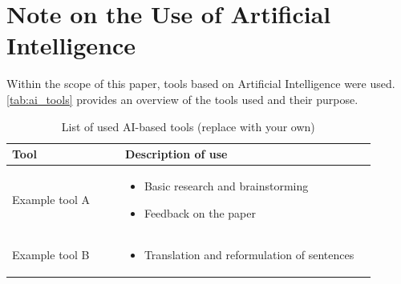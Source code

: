 \chapter{Note on the Use of Artificial Intelligence}\label{app:ai_note}

Within the scope of this paper, tools based on Artificial Intelligence  were used.
\autoref{tab:ai_tools} provides an overview of the tools used and their purpose.

\begin{table}[hbt]
    \centering
    \renewcommand{\arraystretch}{1.5}
    \begin{tabular}{>{\raggedright\arraybackslash}p{0.28\linewidth} >{\raggedright\arraybackslash}p{0.62\linewidth}}
        \textbf{Tool} & \textbf{Description of use}\\
        \hline
        \hline
        Example tool A & \vspace{-\topsep}
        \begin{itemize}[noitemsep,topsep=0pt,partopsep=0pt,parsep=0pt]
            \item Basic research and brainstorming
            \item Feedback on the paper
        \end{itemize} \\
        Example tool B & \vspace{-\topsep}
        \begin{itemize}[noitemsep,topsep=0pt,partopsep=0pt,parsep=0pt]
            \item Translation and reformulation of sentences
        \end{itemize} \\
        \hline
    \end{tabular}
    \caption{List of used AI-based tools (replace with your own)}
    \label{tab:ai_tools}
\end{table}
